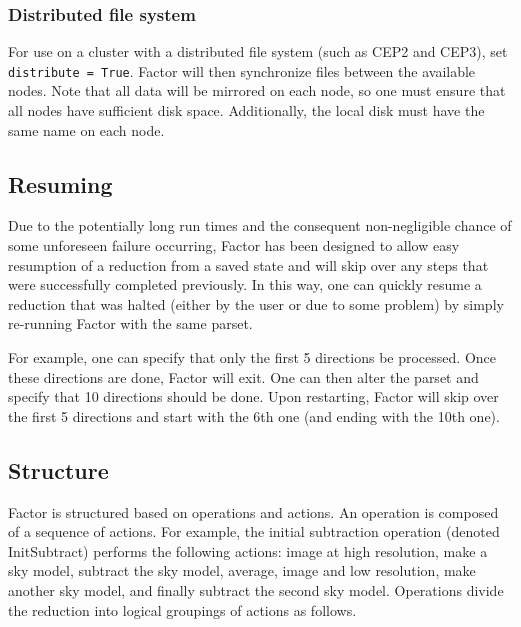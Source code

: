 \documentclass[structabstract]{article}
\begin{document}
{\subsubsection{Distributed file system}
For use on a cluster with a distributed file system (such as CEP2 and CEP3), set
{\tt distribute = True}. Factor will then synchronize files between the
available nodes. Note that all data will be mirrored on each node, so one must
ensure that all nodes have sufficient disk space. Additionally, the local disk
must have the same name on each node.


\subsection{Resuming}
\label{factor:resuming}

Due to the potentially long run times and the consequent non-negligible chance
of some unforeseen failure occurring, Factor has been designed to allow easy
resumption of a reduction from a saved state and will skip over any steps that
were successfully completed previously. In this way, one can quickly resume a
reduction that was halted (either by the user or due to some problem) by simply
re-running Factor with the same parset.

For example, one can specify that only the first 5 directions be processed.
Once these directions are done, Factor will exit. One can then alter the parset
and specify that 10 directions should be done. Upon restarting, Factor will skip
over the first 5 directions and start with the 6th one (and ending with the 10th
one).


\subsection{Structure}
\label{factor:structure}

Factor is structured based on operations and actions. An operation is composed
of a sequence of actions. For example, the initial subtraction operation
(denoted InitSubtract) performs the following actions: image at high resolution,
make a sky model, subtract the sky model, average, image and low resolution,
make another sky model, and finally subtract the second sky model. Operations
divide the reduction into logical groupings of actions as follows.

}
\end{document}
